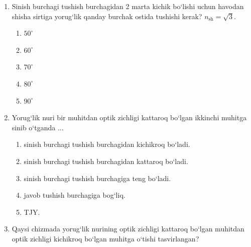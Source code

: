 \begin{enumerate}
\item Sinish burchagi tushish burchagidan 2 marta kichik bo‘lishi uchun havodan shisha sirtiga yorug‘lik qanday burchak ostida tushishi kerak? $n_{\text{sh}}=\sqrt{3}$.
\begin{enumerate}[label=\Alph*)]
\item $50^\circ$
\item $60^\circ$
\item $70^\circ$
\item $80^\circ$
\item $90^\circ$
\end{enumerate}

\item Yorug‘lik nuri bir muhitdan optik zichligi kattaroq bo‘lgan ikkinchi muhitga sinib o‘tganda ...
\begin{enumerate}[label=\Alph*)]
\item sinish burchagi tushish burchagidan kichikroq bo‘ladi.
\item sinish burchagi tushish burchagidan kattaroq bo‘ladi.
\item sinish burchagi tushish burchagiga teng bo‘ladi.
\item javob tushish burchagiga bog‘liq.
\item TJY.
\end{enumerate}

\item Qaysi chizmada yorug‘lik nurining optik zichligi kattaroq bo‘lgan muhitdan optik zichligi kichikroq bo‘lgan muhitga o‘tishi tasvirlangan?

\end{enumerate}
